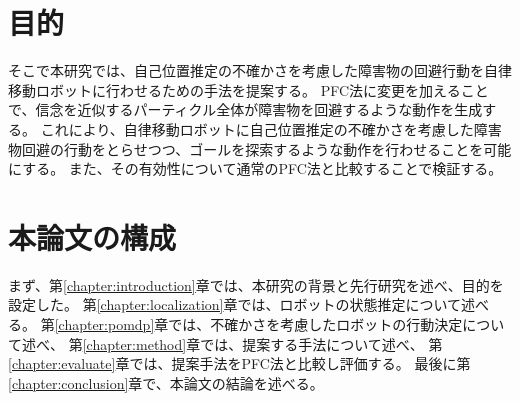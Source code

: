 \section{目的}
そこで本研究では、自己位置推定の不確かさを考慮した障害物の回避行動を自律移動ロボットに行わせるための手法を提案する。
PFC法に変更を加えることで、信念を近似するパーティクル全体が障害物を回避するような動作を生成する。
これにより、自律移動ロボットに自己位置推定の不確かさを考慮した障害物回避の行動をとらせつつ、ゴールを探索するような動作を行わせることを可能にする。
また、その有効性について通常のPFC法と比較することで検証する。


\section{本論文の構成}
まず、第\ref{chapter:introduction}章では、本研究の背景と先行研究を述べ、目的を設定した。
第\ref{chapter:localization}章では、ロボットの状態推定について述べる。
第\ref{chapter:pomdp}章では、不確かさを考慮したロボットの行動決定について述べ、
第\ref{chapter:method}章では、提案する手法について述べ、
第\ref{chapter:evaluate}章では、提案手法をPFC法と比較し評価する。
最後に第\ref{chapter:conclusion}章で、本論文の結論を述べる。



